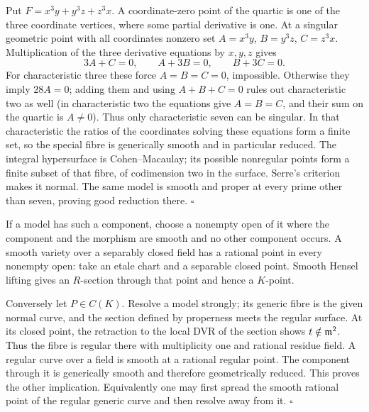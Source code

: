 \documentclass[11pt]{article}
\let\chapterexercise\exercise
\renewcommand{\exercise}[2]{\Needspace{8\baselineskip}\chapterexercise{#1}{#2}}
\begin{document}
\pf Put $F=x^3y+y^3z+z^3x$. A coordinate-zero point of the quartic is one of the three coordinate vertices, where some partial derivative is one. At a singular geometric point with all coordinates nonzero set $A=x^3y$, $B=y^3z$, $C=z^3x$. Multiplication of the three derivative equations by $x,y,z$ gives
\[ 3A+C=0,\qquad A+3B=0,\qquad B+3C=0. \]
For characteristic three these force $A=B=C=0$, impossible. Otherwise they imply $28A=0$; adding them and using $A+B+C=0$ rules out characteristic two as well (in characteristic two the equations give $A=B=C$, and their sum on the quartic is $A\ne0$). Thus only characteristic seven can be singular. In that characteristic the ratios of the coordinates solving these equations form a finite set, so the special fibre is generically smooth and in particular reduced. The integral hypersurface is Cohen--Macaulay; its possible nonregular points form a finite subset of that fibre, of codimension two in the surface. Serre's criterion makes it normal. The same model is smooth and proper at every prime other than seven, proving good reduction there. \hfill$\square$

\pf If a model has such a component, choose a nonempty open of it where the component and the morphism are smooth and no other component occurs. A smooth variety over a separably closed field has a rational point in every nonempty open: take an etale chart and a separable closed point. Smooth Hensel lifting gives an $R$-section through that point and hence a $K$-point.

Conversely let $P\in C(K)$. Resolve a model strongly; its generic fibre is the given normal curve, and the section defined by properness meets the regular surface. At its closed point, the retraction to the local DVR of the section shows $t\notin\mathfrak m^2$. Thus the fibre is regular there with multiplicity one and rational residue field. A regular curve over a field is smooth at a rational regular point. The component through it is generically smooth and therefore geometrically reduced. This proves the other implication. Equivalently one may first spread the smooth rational point of the regular generic curve and then resolve away from it. \hfill$\square$
\end{document}
